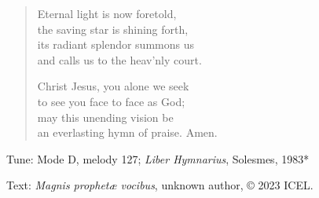 \hymn



\setlength{\vleftmargin}{2em}
\begin{verse}
Eternal light is now foretold,\\
the saving star is shining forth,\\
its radiant splendor summons us\\
and calls us to the heav’nly court.

Christ Jesus, you alone we seek\\
to see you face to face as God;\\
may this unending vision be\\
an everlasting hymn of praise. Amen.
\end{verse}
\setlength{\vleftmargin}{\defleftmargini}


\begin{hymnsource}
Tune: Mode D, melody 127; \emph{Liber Hymnarius}, Solesmes, 1983*

Text: \emph{Magnis prophetæ vocibus}, unknown author, © 2023 ICEL.
\end{hymnsource}
